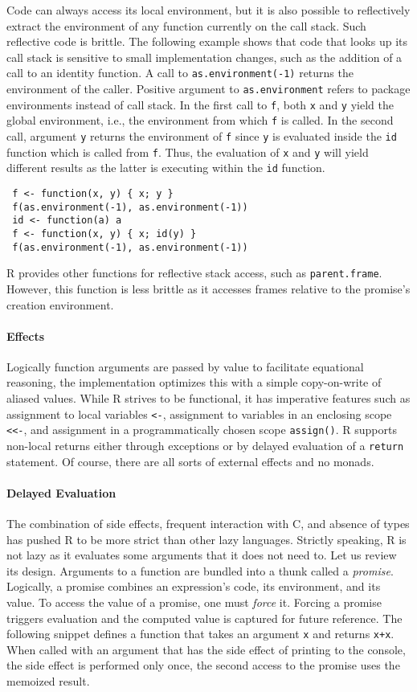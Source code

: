 \documentclass[review,screen,acmsmall]{acmart}
\newcommand{\code}[1]{\lstinline |#1|\xspace}
\renewcommand{\c}[1]{\lstinline |#1|\xspace}
\begin{document}
Code can always access its local environment, but it is also possible to
reflectively extract the environment of any function currently on the call
stack. Such reflective code is brittle. The following example shows that code
that looks up its call stack is sensitive to small implementation changes, such
as the addition of a call to an identity function. A call to
\code{as.environment(-1)} returns the environment of the caller. Positive
argument to \code{as.environment} refers to package environments instead of call
stack. In the first call to \code{f}, both \c x and \c y yield the global
environment, i.e., the environment from which \code{f} is called. In the second
call, argument \c y returns the environment of \c f since \c y is evaluated
inside the \c{id} function which is called from \c f. Thus, the evaluation of \c
x and \c y will yield different results as the latter is executing within the
\c{id} function.
% 
\begin{lstlisting}
 f <- function(x, y) { x; y }
 f(as.environment(-1), as.environment(-1))
 id <- function(a) a
 f <- function(x, y) { x; id(y) }
 f(as.environment(-1), as.environment(-1))
\end{lstlisting}

R provides other functions for reflective stack access, such as
\c{parent.frame}. However, this function is less brittle as it accesses frames
relative to the promise's creation environment.

\paragraph{Effects} Logically function arguments are passed by value to
facilitate equational reasoning, the implementation optimizes this with a simple
copy-on-write of aliased values. While R strives to be functional, it has
imperative features such as assignment to local variables \c{<-}, assignment
to variables in an enclosing scope \c{<<-}, and assignment in a
programmatically chosen scope \c{assign()}. R supports non-local returns
either through exceptions or by delayed evaluation of a \c{return} statement.
Of course, there are all sorts of external effects and no monads.

\paragraph{Delayed Evaluation}
The combination of side effects, frequent interaction with C, and absence of
types has pushed R to be more strict than other lazy languages. Strictly
speaking, R is not lazy as it evaluates some arguments that it does not need to.
Let us review its design. Arguments to a function are bundled into a thunk
called a \emph{promise}. Logically, a promise combines an expression's code, its
environment, and its value. To access the value of a promise, one must
\emph{force} it. Forcing a promise triggers evaluation and the computed value is
captured for future reference. The following snippet defines a function that
takes an argument \c x and returns \c{x+x}. When called with an argument
that has the side effect of printing to the console, the side effect is
performed only once, the second access to the promise uses the memoized result.
\end{document}
